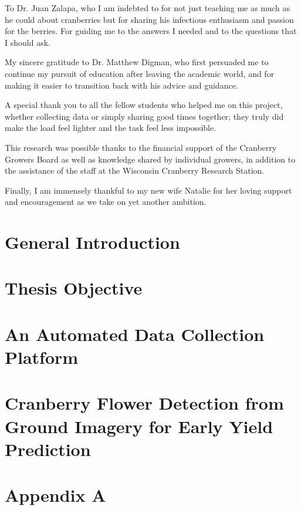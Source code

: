 \documentclass[11pt]{report}
\begin{document}
To Dr. Juan Zalapa, who I am indebted to for not just teaching me as much as he could about cranberries but for sharing his infectious enthusiasm and passion for the berries. For guiding me to the answers I needed and to the questions that I should ask. 

My sincere gratitude to Dr. Matthew Digman, who first persuaded me to continue my pursuit of education after leaving the academic world, and for making it easier to transition back with his advice and guidance.  

A special thank you to all the fellow students who helped me on this project, whether collecting data or simply sharing good times together; they truly did make the load feel lighter and the task feel less impossible.

This research was possible thanks to the financial support of the Cranberry Growers Board as well as knowledge shared by individual  growers, in addition to the assistance of  the staff at the Wisconsin Cranberry Research Station.

Finally, I am immensely thankful to my new wife Natalie for her loving support and encouragement as we take on yet another ambition.

\newpage



\tableofcontents

\listoffigures

\listoftables


\chapter*{General Introduction}


\chapter*{Thesis Objective}


\chapter{An Automated Data Collection Platform}


\chapter{Cranberry Flower Detection from Ground Imagery for Early Yield Prediction}



\appendix
\chapter*{Appendix A}

\end{document}
